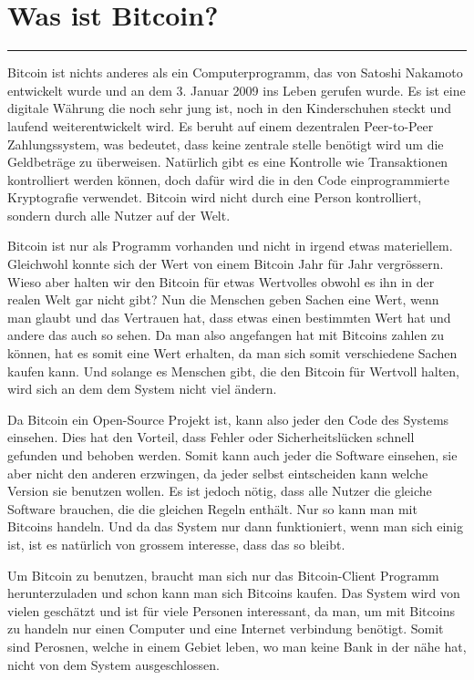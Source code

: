 \section*{Was ist Bitcoin?}
\vspace{-10mm}
\noindent\rule{0.8\textwidth}{0.4pt}

\vspace{5mm}
\noindent
Bitcoin ist nichts anderes als ein Computerprogramm, das von Satoshi Nakamoto entwickelt wurde und an dem 3. Januar 2009 ins Leben gerufen wurde.
Es ist eine digitale Währung die noch sehr jung ist, noch in den Kinderschuhen steckt und laufend weiterentwickelt wird.
Es beruht auf einem dezentralen Peer-to-Peer Zahlungssystem, was bedeutet, dass keine zentrale stelle benötigt wird um die Geldbeträge zu überweisen.
Natürlich gibt es eine Kontrolle wie Transaktionen kontrolliert werden können, doch dafür wird die in den Code einprogrammierte Kryptografie verwendet.
Bitcoin wird nicht durch eine Person kontrolliert, sondern durch alle Nutzer auf der Welt.

\noindent
Bitcoin ist nur als Programm vorhanden und nicht in irgend etwas materiellem. Gleichwohl konnte sich der Wert von einem Bitcoin Jahr für Jahr vergrössern.
Wieso aber halten wir den Bitcoin für etwas Wertvolles obwohl es ihn in der realen Welt gar nicht gibt? Nun die Menschen geben Sachen eine Wert, wenn
man glaubt und das Vertrauen hat, dass etwas einen bestimmten Wert hat und andere das auch so sehen. Da man also angefangen hat mit Bitcoins zahlen zu können,
hat es somit eine Wert erhalten, da man sich somit verschiedene Sachen kaufen kann. Und solange es Menschen gibt, die den Bitcoin für Wertvoll halten, wird sich
an dem dem System nicht viel ändern.

\noindent
Da Bitcoin ein Open-Source Projekt ist, kann also jeder den Code des Systems einsehen. Dies hat den Vorteil, dass Fehler oder Sicherheitslücken schnell
gefunden und behoben werden. Somit kann auch jeder die Software einsehen, sie aber nicht den anderen erzwingen, da jeder selbst eintscheiden kann welche
Version sie benutzen wollen. Es ist jedoch nötig, dass alle Nutzer die gleiche Software brauchen, die die gleichen Regeln enthält. Nur so kann man mit
Bitcoins handeln. Und da das System nur dann funktioniert, wenn man sich einig ist, ist es natürlich von grossem interesse, dass das so bleibt.

\noindent
Um Bitcoin zu benutzen, braucht man sich nur das Bitcoin-Client Programm herunterzuladen und schon kann man sich Bitcoins kaufen. Das System wird von
vielen geschätzt und ist für viele Personen interessant, da man, um mit Bitcoins zu handeln nur einen Computer und eine Internet verbindung benötigt.
Somit sind Perosnen, welche in einem Gebiet leben, wo man keine Bank in der nähe hat, nicht von dem System ausgeschlossen.

